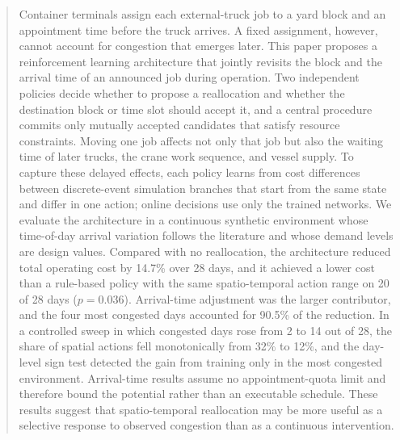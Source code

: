\documentclass[a4paper]{llncs}
\begin{document}
\begin{abstract}
Container terminals assign each external-truck job to a yard block and
an appointment time before the truck arrives. A fixed assignment,
however, cannot account for congestion that emerges later. This paper
proposes a reinforcement learning architecture that jointly revisits the
block and the arrival time of an announced job during operation. Two
independent policies decide whether to propose a reallocation and
whether the destination block or time slot should accept it, and a
central procedure commits only mutually accepted candidates that satisfy
resource constraints. Moving one job affects not only that job but also
the waiting time of later trucks, the crane work sequence, and vessel
supply. To capture these delayed effects, each policy learns from cost
differences between discrete-event simulation branches that start from
the same state and differ in one action; online decisions use only the
trained networks. We evaluate the architecture in a continuous synthetic
environment whose time-of-day arrival variation follows the literature
and whose demand levels are design values. Compared with no
reallocation, the architecture reduced total operating cost by 14.7\%
over 28 days, and it achieved a lower cost than a rule-based policy with
the same spatio-temporal action range on 20 of 28 days ($p=0.036$).
Arrival-time adjustment was the larger contributor, and the four most
congested days accounted for 90.5\% of the reduction. In a controlled
sweep in which congested days rose from 2 to 14 out of 28, the share of
spatial actions fell monotonically from 32\% to 12\%, and the day-level sign test
detected the gain from training only in the most congested environment. Arrival-time results assume no appointment-quota
limit and therefore bound the potential rather than an executable
schedule. These results suggest that spatio-temporal reallocation may be
more useful as a selective response to observed congestion than as a
continuous intervention.

\end{abstract}

\end{document}
